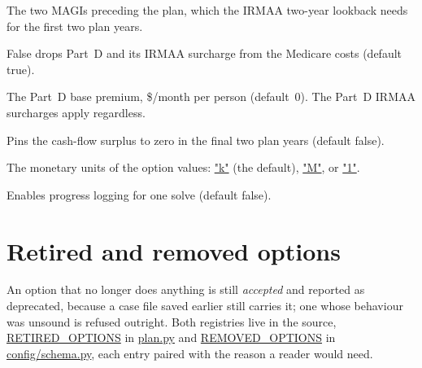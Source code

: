 \documentclass[fleqn,12pt]{report}
\newcommand{\code}[1]{\url{#1}}
\begin{document}
\begin{description}[style=nextline, leftmargin=1.5cm, font=\ttfamily]
\item[previousMAGIs]
The two MAGIs preceding the plan, which the IRMAA two-year lookback needs for the
first two plan years.
\item[includeMedicarePartD]
False drops Part~D and its IRMAA surcharge from the Medicare costs
(default true).
\item[medicarePartDBasePremium]
The Part~D base premium, \$/month per person (default~0).  The Part~D IRMAA
surcharges apply regardless.
\item[noLateSurplus]
Pins the cash-flow surplus to zero in the final two plan years (default false).
\item[units]
The monetary units of the option values: \code{"k"} (the default), \code{"M"},
or \code{"1"}.
\item[verbose]
Enables progress logging for one solve (default false).
\end{description}

\section{Retired and removed options}

An option that no longer does anything is still \emph{accepted} and reported as
deprecated, because a case file saved earlier still carries it; one whose
behaviour was unsound is refused outright.
Both registries live in the source, \code{RETIRED_OPTIONS} in \code{plan.py}
and \code{REMOVED_OPTIONS} in \code{config/schema.py}, each entry paired with
the reason a reader would need.
\end{document}
